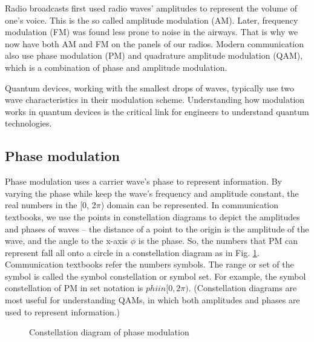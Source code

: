 \documentclass{book}
\begin{document}
Radio broadcasts first used radio waves' amplitudes to represent the volume of one's voice. This is the so called amplitude modulation (AM). Later, frequency modulation (FM) was found less prone to noise in the airways. That is why we now have both AM and FM on the panels of our radios. Modern communication also use phase modulation (PM) and quadrature amplitude modulation (QAM), which is a combination of phase and amplitude modulation.

Quantum devices, working with the smallest drops of waves, typically use two wave characteristics in their modulation scheme. Understanding how modulation works in quantum devices is the critical link for engineers to understand quantum technologies.

\subsection{Phase modulation}
Phase modulation uses a carrier wave's phase to represent information. By varying the phase while keep the wave's frequency and amplitude constant, the real numbers in the [0, 2$\pi$) domain can be represented. In communication textbooks, we use the points in constellation diagrams to depict the amplitudes and phases of waves -- 
the distance of a point to the origin is the amplitude of the wave, and the angle to the x-axis $\phi$ is the phase. 
So, the numbers that PM can represent fall all onto a circle in a constellation diagram as in Fig. \ref{PM}. Communication textbooks refer the numbers symbols. The range or set of the symbol is called the symbol constellation or symbol set. For example, the symbol constellation of PM in set notation is $phi in [0, 2\pi)$.
(Constellation diagrams are most useful for understanding QAMs, in which both amplitudes and phases are used to represent information.)

\begin{figure}[ht]
\caption{Constellation diagram of phase modulation}
\label{PM}
\end{figure}
\end{document}
